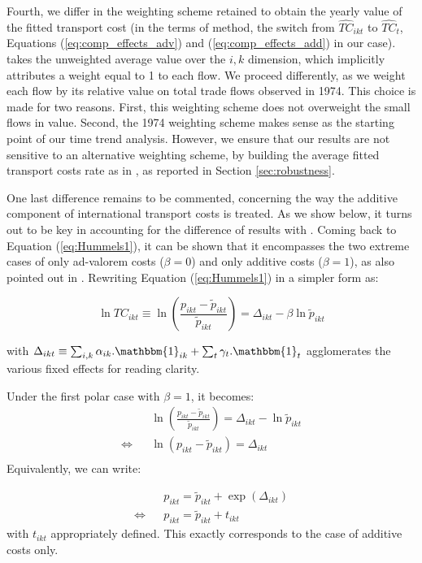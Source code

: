 \documentclass[a4paper,11pt]{article}
\begin{document}
Fourth, we differ in the weighting scheme retained to obtain the yearly value of the fitted transport cost (in the terms of \cite{hummels2007} method, the switch from $\widehat{TC}_{ikt}$ to $\widehat{TC}_{t}$, Equations (\ref{eq:comp_effects_adv}) and (\ref{eq:comp_effects_add}) in our case).
\cite{hummels2007} takes the unweighted average value over the $i,k$ dimension, which implicitly attributes a weight equal to 1 to each flow.
We proceed differently, as we weight each flow by its relative value on total trade flows observed in 1974.
This choice is made for two reasons.
First, this weighting scheme does not overweight the small flows in value.
Second, the 1974 weighting scheme makes sense as the starting point of our time trend analysis.
However, we ensure that our results are not sensitive to an alternative weighting scheme, by building the average fitted transport costs rate as in \cite{hummels2007}, as reported in Section \ref{sec:robustness}.

One last difference remains to be commented, concerning the way the additive component of international transport costs is treated.
As we show below, it turns out to be key in accounting for the difference of results with \cite{hummels2007}.
Coming back to Equation (\ref{eq:Hummels1}), it can be shown that it encompasses the two extreme cases of only ad-valorem costs ($\beta = 0$) and only additive costs ($\beta=1$), as also pointed out in \cite{hummels_skiba}. Rewriting Equation (\ref{eq:Hummels1}) in a simpler form as:

$$\ln TC_{ikt} \equiv \ln \left(\frac{p_{ikt}- \widetilde{p}_{ikt}}{\widetilde{p}_{ikt}} \right) = \Delta_{ikt}- \beta \ln \widetilde{p}_{ikt} $$

\noindent with $\Delta_{ikt} \equiv \sum_{i,k}\alpha_{ik}.\mathbbm{1}_{ik}+ \sum_{t}\gamma_{t}.\mathbbm{1}_{t}$ agglomerates the various fixed effects for reading clarity.

Under the first polar case with $\beta = 1$, it becomes:
\begin{eqnarray*}
&&\ln \left(\frac{p_{ikt}- \widetilde{p}_{ikt}}{\widetilde{p}_{ikt}} \right) = \Delta_{ikt}- \ln \widetilde{p}_{ikt} \\
\Leftrightarrow && \ln (p_{ikt}- \widetilde{p}_{ikt}) = \Delta_{ikt} \\
\end{eqnarray*}
\noindent Equivalently, we can write:

\begin{eqnarray*}
&&p_{ikt} = \widetilde{p}_{ikt} + \exp(\Delta_{ikt})\\
\Leftrightarrow && p_{ikt} = \widetilde{p}_{ikt} + t_{ikt}
\end{eqnarray*}
\noindent with $t_{ikt}$ appropriately defined.
This exactly corresponds to the case of additive costs only.
\end{document}
